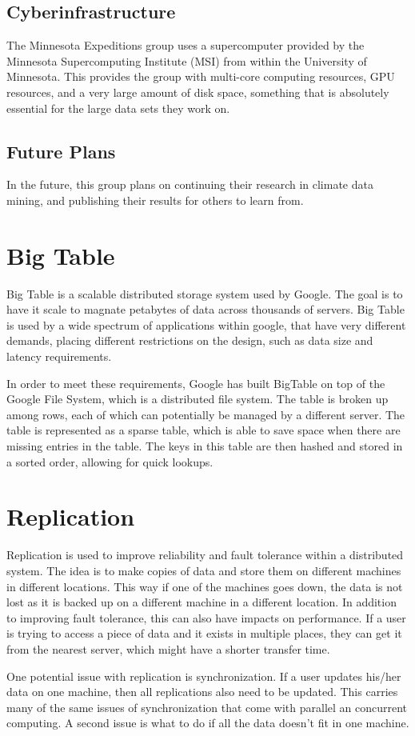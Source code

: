 \documentclass[11pt]{article}
\begin{document}
\subsection{Cyberinfrastructure}
The Minnesota Expeditions group uses a supercomputer provided by the Minnesota Supercomputing Institute (MSI) from within the University of Minnesota.  This provides the group with multi-core computing resources, GPU resources, and a very large amount of disk space, something that is absolutely essential for the large data sets they work on.  

\subsection{Future Plans}
In the future, this group plans on continuing their research in climate data mining, and publishing their results for others to learn from.

\newpage

\section{Big Table}
Big Table is a scalable distributed storage system used by Google.  The goal is to have it scale to magnate petabytes of data across thousands of servers.  Big Table is used by a wide spectrum of applications within google, that have very different demands, placing different restrictions on the design, such as data size and latency requirements. 

In order to meet these requirements, Google has built BigTable on top of the Google File System, which is a distributed file system.  The table is broken up among rows, each of which can potentially be managed by a different server.  The table is represented as a sparse table, which is able to save space when there are missing entries in the table.  The keys in this table are then hashed and stored in a sorted order, allowing for quick lookups.  

\section{Replication}
Replication is used to improve reliability and fault tolerance within a distributed system.  The idea is to make copies of data and store them on different machines in different locations.  This way if one of the machines goes down, the data is not lost as it is backed up on a different machine in a different location.  In addition to improving fault tolerance, this can also have impacts on performance.  If a user is trying to access a piece of data and it exists in multiple places, they can get it from the nearest server, which might have a shorter transfer time.

One potential issue with replication is synchronization.  If a user updates his/her data on one machine, then all replications also need to be updated.  This carries many of the same issues of synchronization that come with parallel an concurrent computing.  A second issue is what to do if all the data doesn't fit in one machine.  
\end{document}
